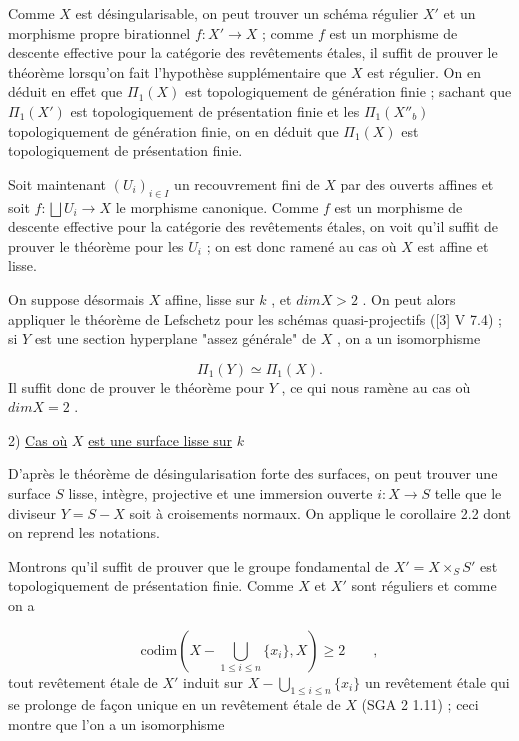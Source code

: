 Comme $X$ est désingularisable, on peut trouver un schéma régulier $X'$ et un morphisme propre birationnel $f : X' \longrightarrow X$ ; comme $f$ est un morphisme de descente effective pour la catégorie des revêtements étales, il suffit de prouver le théorème lorsqu'on fait l'hypothèse supplémentaire que $X$ est régulier. On en déduit en effet que $\Pi_1(X)$ est topologiquement de génération finie ; sachant que $\Pi_1(X')$ est topologiquement de présentation finie et les $\Pi_1(X''_b)$ topologiquement de génération finie, on en déduit que $\Pi_1(X)$ est topologiquement de présentation finie.

Soit maintenant $(U_i)_{i \in I}$ un recouvrement fini de $X$ par des ouverts affines et soit $f : \bigsqcup U_i \longrightarrow X$ le morphisme canonique. Comme $f$ est un morphisme de descente effective pour la catégorie des revêtements étales, on voit qu'il suffit de prouver le théorème pour les $U_i$ ; on est donc ramené au cas où $X$ est affine et lisse.

On suppose désormais $X$ affine, lisse sur $k$ , et $dim X > 2$ . On peut alors appliquer le théorème de Lefschetz pour les schémas quasi-projectifs ([3] V 7.4) ; si $Y$ est une section hyperplane "assez générale" de $X$ , on a un isomorphisme

\begin{equation*}
\Pi_1(Y) \simeq \Pi_1(X) .
\end{equation*}
Il suffit donc de prouver le théorème pour $Y$ , ce qui nous ramène au cas où $dim X = 2$ .


2) \underline{Cas où} $X$ \underline{est une surface lisse sur} $k$

D'après le théorème de désingularisation forte des surfaces, on peut trouver une surface $S$ lisse, intègre, projective et une immersion ouverte $i : X \longrightarrow S$ telle que le diviseur $Y = S - X$ soit à croisements normaux. On applique le corollaire 2.2 dont on reprend les notations.


Montrons qu'il suffit de prouver que le groupe fondamental de $X' = X\times_S S'$ est topologiquement de présentation finie. Comme $X$ et $X'$ sont réguliers et comme on a

\begin{equation*}
\mathrm{codim}(X- \bigcup_{1\leqslant i\leqslant n} \{x_i\},X) \geqslant 2 \qquad ,
\end{equation*}
tout revêtement étale de $X'$ induit sur $X- \bigcup_{1\leqslant i\leqslant n}\{x_i\}$ un revêtement étale qui se prolonge de façon unique en un revêtement étale de $X$ (SGA 2 1.11) ; ceci montre que l'on a un isomorphisme

